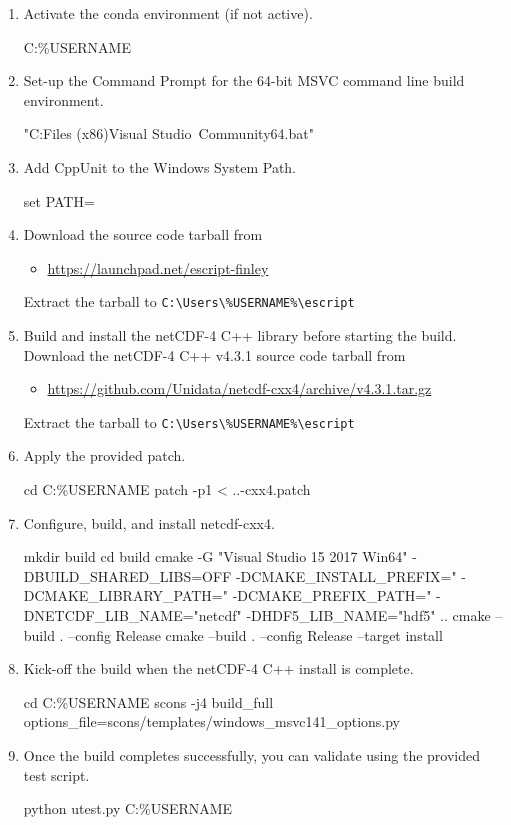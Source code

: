 \begin{enumerate}
\item Activate the conda environment (if not active).
\begin{shellCode}
C:\Users\%USERNAME%
\end{shellCode}
\item Set-up the Command Prompt for the 64-bit MSVC command line build environment.
\begin{shellCode}
"C:\Program Files (x86)\Microsoft Visual Studio\
    Community\VC\Auxiliary\Build\vcvars64.bat"
\end{shellCode}
\item Add CppUnit to the Windows System Path.
\begin{shellCode}
set PATH=%
\end{shellCode}
\item Download the \escript source code tarball from
\begin{itemize}
\item[] \url{https://launchpad.net/escript-finley}
\end{itemize}
Extract the tarball to \verb!C:\Users\%USERNAME%\escript!
\item Build and install the netCDF-4 C++ library before starting the \escript
build.  Download the netCDF-4 C++ v4.3.1 source code tarball from
\begin{itemize}
\item[] \url{https://github.com/Unidata/netcdf-cxx4/archive/v4.3.1.tar.gz}
\end{itemize}
Extract the tarball to \verb!C:\Users\%USERNAME%\escript!
\item Apply the provided patch.
\begin{shellCode}
cd C:\Users\%USERNAME%
patch -p1 < ..\src\tools\anaconda{}\netcdf-cxx4.patch
\end{shellCode}
\item Configure, build, and install netcdf-cxx4.
\begin{shellCode}
mkdir build
cd build
cmake -G "Visual Studio 15 2017 Win64" -DBUILD_SHARED_LIBS=OFF
    -DCMAKE_INSTALL_PREFIX="%
    -DCMAKE_LIBRARY_PATH="%
    -DCMAKE_PREFIX_PATH="%
    -DNETCDF_LIB_NAME="netcdf" -DHDF5_LIB_NAME="hdf5" ..
cmake --build . --config Release
cmake --build . --config Release --target install
\end{shellCode}
\item Kick-off the \escript build when the netCDF-4 C++ install is complete.
\begin{shellCode}
cd C:\Users\%USERNAME%
scons -j4 build_full options_file=scons/templates/windows_msvc141_options.py
\end{shellCode}
\item Once the build completes successfully, you can validate \escript using
the provided test script.
\begin{shellCode}
python utest.py C:\Users\%USERNAME%
\end{shellCode}
\end{enumerate}

